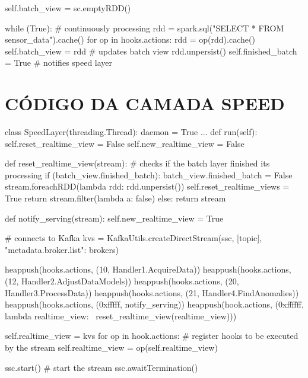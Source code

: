 \begin{apendicesenv}
\begin{python}
        self.batch_view = sc.emptyRDD()

        while (True):
            # continuously processing
            rdd = spark.sql("SELECT * FROM sensor_data").cache()
                for op in hooks.actions:
                rdd = op(rdd).cache()
            self.batch_view = rdd # updates batch view
            rdd.unpersist()
            self.finished_batch = True # notifies speed layer
\end{python}

\section{CÓDIGO DA CAMADA SPEED}
\begin{python}
class SpeedLayer(threading.Thread):
    daemon = True
    ...
    def run(self):
        self.reset_realtime_view = False
        self.new_realtime_view = False

        def reset_realtime_view(stream):
            # checks if the batch layer finished its processing
            if (batch_view.finished_batch):
                batch_view.finished_batch = False
                stream.foreachRDD(lambda rdd: rdd.unpersist())
                self.reset_realtime_views = True
                return stream.filter(lambda a: false)
            else:
                return stream

        def notify_serving(stream):
            self.new_realtime_view = True

        # connects to Kafka
        kvs = KafkaUtils.createDirectStream(ssc, [topic], \\
            {"metadata.broker.list": brokers})

        heappush(hooks.actions, (10, Handler1.AcquireData))
        heappush(hooks.actions, (12, Handler2.AdjustDataModels))
        heappush(hooks.actions, (20, Handler3.ProcessData))
        heappush(hooks.actions, (21, Handler4.FindAnomalies))
        heappush(hooks.actions, (0xfffff, notify_serving))
        heappush(hook.actions, (0xffffff, lambda realtime_view: \
            reset_realtime_view(realtime_view)))

        self.realtime_view = kvs
        for op in hook.actions:
              # register hooks to be executed by the stream
              self.realtime_view = op(self.realtime_view)

        ssc.start() # start the stream
        ssc.awaitTermination()

\end{python}


\end{apendicesenv}
